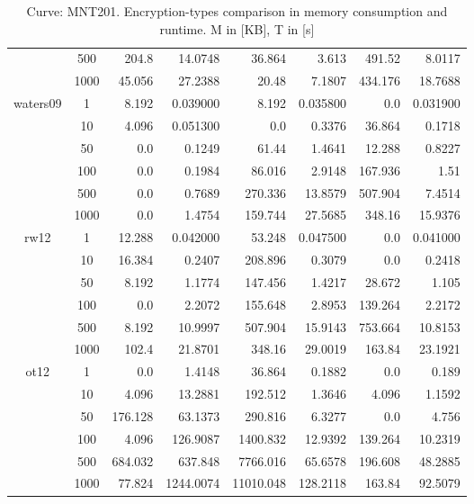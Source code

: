 \documentclass[twoside,11pt,titlepage,a4paper,english,bibliography=totocnumbered,listof=numbered]{scrbook}
\begin{document}
\begin{table}[ht]
{\begin{tabular}{|c|c|r|r|r|r|r|r|}
&500&  204.8      &   14.0748   &   36.864    &    3.613    &  491.52     &    8.0117    \\
&1000&   45.056    &   27.2388   &   20.48     &    7.1807   &  434.176    &   18.7688    \\
\hline
\multirow{6}{*}{waters09} &1&    8.192    &    0.039000 &    8.192    &    0.035800 &    0.0      &    0.031900  \\
&10&    4.096    &    0.051300 &    0.0      &    0.3376   &   36.864    &    0.1718    \\
&50&    0.0      &    0.1249   &   61.44     &    1.4641   &   12.288    &    0.8227    \\
&100&    0.0      &    0.1984   &   86.016    &    2.9148   &  167.936    &    1.51      \\
&500&    0.0      &    0.7689   &  270.336    &   13.8579   &  507.904    &    7.4514    \\
&1000&    0.0      &    1.4754   &  159.744    &   27.5685   &  348.16     &   15.9376    \\
\hline
\multirow{6}{*}{rw12} &1&   12.288    &    0.042000 &   53.248    &    0.047500 &    0.0      &    0.041000  \\
&10&   16.384    &    0.2407   &  208.896    &    0.3079   &    0.0      &    0.2418    \\
&50&    8.192    &    1.1774   &  147.456    &    1.4217   &   28.672    &    1.105     \\
&100&    0.0      &    2.2072   &  155.648    &    2.8953   &  139.264    &    2.2172    \\
&500&    8.192    &   10.9997   &  507.904    &   15.9143   &  753.664    &   10.8153    \\
&1000&  102.4      &   21.8701   &  348.16     &   29.0019   &  163.84     &   23.1921    \\
\hline
\multirow{6}{*}{ot12} &1&    0.0      &    1.4148   &   36.864    &    0.1882   &    0.0      &    0.189     \\
&10&    4.096    &   13.2881   &  192.512    &    1.3646   &    4.096    &    1.1592    \\
&50&  176.128    &   63.1373   &  290.816    &    6.3277   &    0.0      &    4.756     \\
&100&    4.096    &  126.9087   & 1400.832    &   12.9392   &  139.264    &   10.2319    \\
&500&  684.032    &  637.848    & 7766.016    &   65.6578   &  196.608    &   48.2885    \\
&1000&   77.824    & 1244.0074   &11010.048    &  128.2118   &  163.84     &   92.5079    \\
\hline
\end{tabular}}\caption{Curve: MNT201. Encryption-types comparison in memory consumption and runtime. M in [KB], T in [s]}\label{table:abe_mem_run_MNT201} \end{table} 
\end{document}
